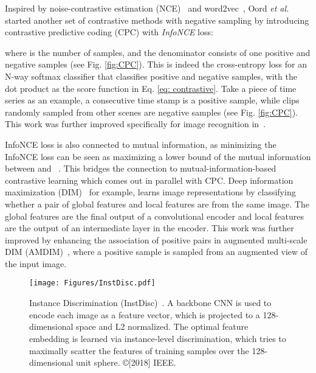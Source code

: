 \documentclass[lettersize,journal]{IEEEtran}
\newcommand{\etal}{\textit{et al.}}
\begin{document}
Inspired by noise-contrastive estimation (NCE)~\cite{gutmann2010noise} and word2vec~\cite{mikolov2013efficient,mikolov2013distributed}, Oord \etal~\cite{oord2018representation} started another set of contrastive methods with negative sampling by introducing contrastive predictive coding (CPC) with \textit{InfoNCE} loss:



\noindent where  is the number of samples, and the denominator consists of one positive and  negative samples (see Fig. \ref{fig:CPC}). This is indeed the cross-entropy loss for an N-way softmax classifier that classifies positive and negative samples, with the dot product as the score function in Eq. \ref{eq: contrastive}. Take a piece of time series as an example, a consecutive time stamp is a positive sample, while clips randomly sampled from other scenes are negative samples (see Fig. \ref{fig:CPC}). This work was further improved specifically for image recognition in~\cite{henaff2020data}. 

InfoNCE loss is also connected to mutual information, as minimizing the InfoNCE loss can be seen as maximizing a lower bound of the mutual information between  and ~\cite{poole2019variational}. This bridges the connection to mutual-information-based contrastive learning which comes out in parallel with CPC. Deep information maximization (DIM)~\cite{hjelm2018learning} for example, learns image representations by classifying whether a pair of global features and local features are from the same image. The global features are the final output of a convolutional encoder and local features are the output of an intermediate layer in the encoder. This work was further improved by enhancing the association of positive pairs in augmented multi-scale DIM (AMDIM)~\cite{bachman2019learning}, where a positive sample is sampled from an augmented view of the input image.


\begin{figure*}
\centering
\texttt{[image: Figures/InstDisc.pdf]}
\caption[InstDisc]{Instance Discrimination (InstDisc)~\cite{wu2018unsupervised}. A backbone CNN is used to encode each image as a feature vector, which is projected to a 128-dimensional space and L2 normalized. The optimal feature embedding is learned via instance-level
discrimination, which tries to maximally scatter the features of training samples over the 128-dimensional unit sphere. ©[2018] IEEE.}
\label{fig:InstDisc}
\end{figure*}
\end{document}
